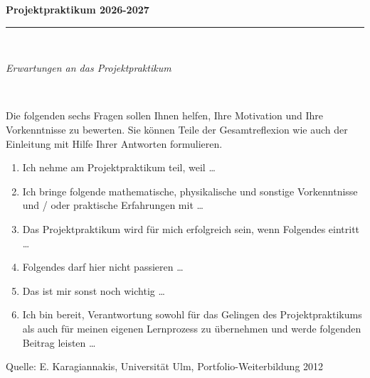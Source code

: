 \documentclass[pdftex,12pt,twoside,footsepline,headsepline,a4paper,final]{scrreprt}
\newcommand{\platz}{\vspace{2.1cm}}
\begin{document}
\begin{huge}
\textbf{Projektpraktikum 2026-2027}
\end{huge}

\par\noindent\rule{\textwidth}{0.4pt}

$_{}$



\begin{Large}
\textcolor[rgb]{0.31,0.51,0.74}{\emph{Erwartungen an das Projektpraktikum}}
\end{Large}


$_{}$


Die folgenden sechs Fragen sollen Ihnen helfen, Ihre Motivation und Ihre Vorkenntnisse zu bewerten.
Sie k\"{o}nnen Teile der Gesamtreflexion wie auch der Einleitung mit Hilfe Ihrer Antworten formulieren.

\begin{enumerate}

\item Ich nehme am Projektpraktikum teil, weil \ldots

\platz

\item Ich bringe folgende mathematische, physikalische und sonstige Vorkenntnisse und / oder
praktische Erfahrungen mit \ldots

\platz


\item Das Projektpraktikum wird f\"{u}r mich erfolgreich sein, wenn Folgendes eintritt \ldots

\platz


\item Folgendes darf hier nicht passieren \ldots

\platz


\item Das ist mir sonst noch wichtig \ldots

\platz


\item Ich bin bereit, Verantwortung sowohl f\"{u}r das Gelingen des Projektpraktikums als auch f\"{u}r
meinen eigenen Lernprozess zu \"{u}bernehmen und werde folgenden Beitrag leisten \ldots


\platz

\end{enumerate}


Quelle: E. Karagiannakis, Universit\"{a}t Ulm, Portfolio-Weiterbildung 2012
\end{document}
